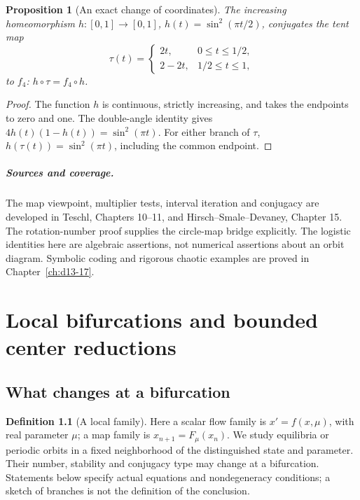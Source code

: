 \documentclass[11pt,oneside]{book}
\newtheorem{proposition}[theorem]{Proposition}
\theoremstyle{definition}
\newtheorem{definition}[theorem]{Definition}
\theoremstyle{remark}\newtheorem{remark}[theorem]{Remark}
\begin{document}
\begin{proposition}[An exact change of coordinates]\label{d13:15:logistic-tent}
The increasing homeomorphism \(h:[0,1]\to[0,1]\),
\(h(t)=\sin^2(\pi t/2)\), conjugates the tent map
\[
 \tau(t)=
 \begin{cases}2t,&0\leq t\leq1/2,\\2-2t,&1/2\leq t\leq1,\end{cases}
\]
to \(f_4\): \(h\circ\tau=f_4\circ h\).
\end{proposition}
\begin{proof}
The function \(h\) is continuous, strictly increasing, and takes the
endpoints to zero and one. The double-angle identity gives
\(4h(t)(1-h(t))=\sin^2(\pi t)\). For either branch of \(\tau\),
\(h(\tau(t))=\sin^2(\pi t)\), including the common endpoint.
\end{proof}

\paragraph{Sources and coverage.}
The map viewpoint, multiplier tests, interval iteration and conjugacy
are developed in Teschl, Chapters 10--11, and Hirsch--Smale--Devaney,
Chapter 15. The rotation-number proof supplies the circle-map bridge
explicitly. The logistic identities here are algebraic assertions,
not numerical assertions about an orbit diagram. Symbolic coding and
rigorous chaotic examples are proved in Chapter~\ref{ch:d13-17}.



\chapter{Local bifurcations and bounded center reductions}\label{ch:d13-16}

\section{What changes at a bifurcation}

\begin{definition}[A local family]\label{d13:16:family-definition}
Here a scalar flow family is \(x'=f(x,\mu)\), with real parameter \(\mu\);
a map family is \(x_{n+1}=F_\mu(x_n)\). We study equilibria or periodic
orbits in a fixed neighborhood of the distinguished state and parameter.
Their number, stability and conjugacy type may change at a bifurcation.
Statements below specify actual equations and nondegeneracy conditions;
a sketch of branches is not the definition of the conclusion.
\end{definition}
\end{document}
